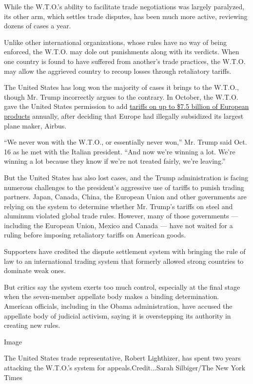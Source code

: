 While the W.T.O.'s ability to facilitate trade negotiations was largely
paralyzed, its other arm, which settles trade disputes, has been much
more active, reviewing dozens of cases a year.

Unlike other international organizations, whose rules have no way of
being enforced, the W.T.O. may dole out punishments along with its
verdicts. When one country is found to have suffered from another's
trade practices, the W.T.O. may allow the aggrieved country to recoup
losses through retaliatory tariffs.

The United States has long won the majority of cases it brings to the
W.T.O., though Mr. Trump incorrectly argues to the contrary. In October,
the W.T.O. gave the United States permission to add
\href{https://www.nytimes.com/2019/10/02/us/politics/airbus-tariffs-wto.html}{tariffs
on up to \$7.5 billion of European products} annually, after deciding
that Europe had illegally subsidized its largest plane maker, Airbus.

``We never won with the W.T.O., or essentially never won,'' Mr. Trump
said Oct. 16 as he met with the Italian president. ``And now we're
winning a lot. We're winning a lot because they know if we're not
treated fairly, we're leaving.''

But the United States has also lost cases, and the Trump administration
is facing numerous challenges to the president's aggressive use of
tariffs to punish trading partners. Japan, Canada, China, the European
Union and other governments are relying on the system to determine
whether Mr. Trump's tariffs on steel and aluminum violated global trade
rules. However, many of those governments --- including the European
Union, Mexico and Canada --- have not waited for a ruling before
imposing retaliatory tariffs on American goods.

Supporters have credited the dispute settlement system with bringing the
rule of law to an international trading system that formerly allowed
strong countries to dominate weak ones.

But critics say the system exerts too much control, especially at the
final stage when the seven-member appellate body makes a binding
determination. American officials, including in the Obama
administration, have accused the appellate body of judicial activism,
saying it is overstepping its authority in creating new rules.

Image

The United States trade representative, Robert Lighthizer, has spent two
years attacking the W.T.O.'s system for appeals.Credit...Sarah
Silbiger/The New York Times


